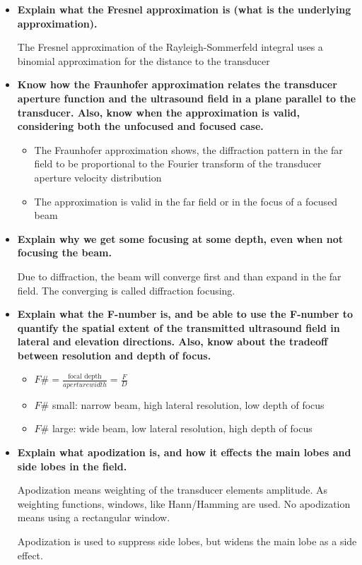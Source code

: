 \documentclass[10pt,a4paper,noendnumber=true]{scrartcl}
\begin{document}
\begin{itemize}
\item \textbf{Explain what the Fresnel approximation is (what is the underlying approximation).}

The Fresnel approximation of the Rayleigh-Sommerfeld integral uses a binomial approximation for the distance to the transducer


\item \textbf{Know how the Fraunhofer approximation relates the transducer aperture function and the ultrasound field in a plane parallel to the transducer. Also, know when the approximation is valid, considering both the unfocused and focused case.}
\begin{itemize}
\item The Fraunhofer approximation shows, the diffraction pattern in the far field to be proportional to the Fourier transform of the transducer aperture velocity distribution
\item The approximation is valid in the far field or in the focus of a focused beam
\end{itemize}

\item \textbf{Explain why we get some focusing at some depth, even when not focusing the beam.}

Due to diffraction, the beam will converge first and than expand in the far field. The converging is called diffraction focusing.

\item \textbf{Explain what the F-number is, and be able to use the F-number to quantify the spatial extent of the transmitted ultrasound field in lateral and elevation directions. Also, know about the tradeoff between resolution and depth of focus.}
\begin{itemize}
\item $F\#=\frac{\text{focal depth}}{aperture width}=\frac{F}{D}$
\item $F\#$ small: narrow beam, high lateral resolution, low depth of focus
\item $F\#$ large: wide beam, low lateral resolution, high depth of focus
\end{itemize}

\item \textbf{Explain what apodization is, and how it effects the main lobes and side lobes in the field.}

Apodization means weighting of the transducer elements amplitude. As weighting functions, windows, like Hann/Hamming are used. No apodization means using a rectangular window.

Apodization is used to suppress side lobes, but widens the main lobe as a side effect.
\end{itemize}
\end{document}
